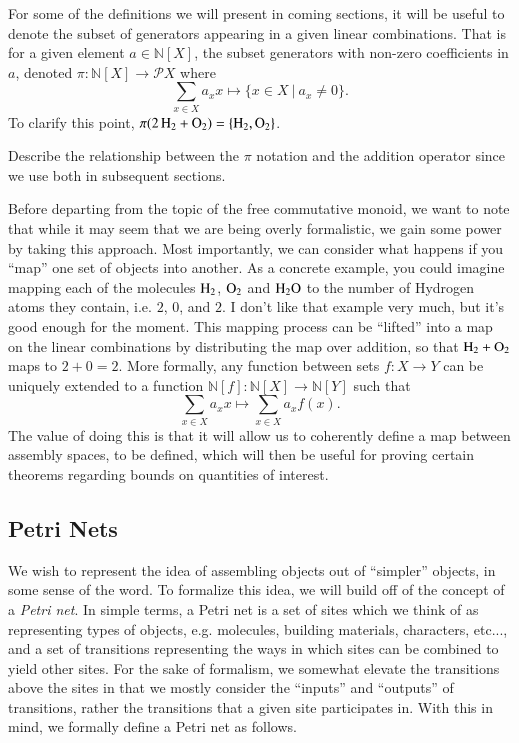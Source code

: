 \documentclass[aps,prd,onecolumn,nofootinbib,letterpaper,preprintnumbers,superscriptaddress,eqsecnum]{revtex4}
\theoremstyle{definition}
\newcommand{\N}{\mathbb{N}}
\newcommand{\powerset}{\mathcal{P}}
\newcommand{\red}[1]{{\color{red}#1}}
\begin{document}
For some of the definitions we will present in coming sections, it will be useful to denote the subset of generators appearing in a given linear combinations. That is for a given element $a \in \N[X]$, the subset generators with non-zero coefficients in $a$, denoted $\pi : \N[X] \rightarrow \powerset{X}$ where
\begin{equation*}
    \displaystyle \sum_{x \in X} a_x x \mapsto \{ x \in X ~|~ a_x \ne 0 \}.
\end{equation*}
To clarify this point, $\pi(\ce{2H2} + \ce{O_2}) = \{\ce{H_2}, \ce{O_2}\}$.

\red{Describe the relationship between the $\pi$ notation and the addition operator since we use both in subsequent sections.}

Before departing from the topic of the free commutative monoid, we want to note that while it may seem that we are being overly formalistic, we gain some power by taking this approach.
Most importantly, we can consider what happens if you ``map'' one set of objects into another.
As a concrete example, you could imagine mapping each of the molecules $\ce{H_2}$, $\ce{O_2}$ and $\ce{H_2O}$ to the number of Hydrogen atoms they contain, i.e. $2$, $0$, and $2$.
\red{I don't like that example very much, but it's good enough for the moment.}
This mapping process can be ``lifted'' into a map on the linear combinations by distributing the map over addition, so that $\ce{H_2} + \ce{O_2}$ maps to $2 + 0 = 2$. More formally, any function between sets $f : X \rightarrow Y$ can be uniquely extended to a function $\N[f] : \N[X] \rightarrow \N[Y]$ such that
\begin{equation*}
    \sum_{x \in X} a_x x \mapsto \sum_{x \in X} a_x f(x).
\end{equation*}
The value of doing this is that it will allow us to coherently define a map between assembly spaces, to be defined, which will then be useful for proving certain theorems regarding bounds on quantities of interest.

\subsection{Petri Nets}

We wish to represent the idea of assembling objects out of ``simpler'' objects, in some sense of the word.
To formalize this idea, we will build off of the concept of a \textit{Petri net}.
In simple terms, a Petri net is a set of sites which we think of as representing types of objects, e.g. molecules, building materials, characters, etc..., and a set of transitions representing the ways in which sites can be combined to yield other sites.
For the sake of formalism, we somewhat elevate the transitions above the sites in that we mostly consider the ``inputs'' and ``outputs'' of transitions, rather the transitions that a given site participates in.
With this in mind, we formally define a Petri net as follows.
\end{document}
